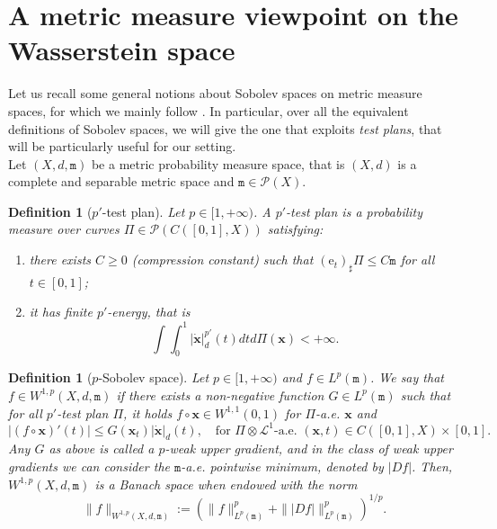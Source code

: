 \documentclass[10pt,leqno]{amsart}
\numberwithin{equation}{section}
\newtheorem{df}[teorema]{Definition}
\newcommand{\PP}{\mathcal{P}}
\newcommand{\e}{\mathrm{e}}
\newcommand{\ttm}{\mathtt{m}}
\begin{document}
\section{A metric measure viewpoint on the Wasserstein space}\label{sec: sobolev and curvature}
Let us recall some general notions about Sobolev spaces on metric measure spaces, for which we mainly follow \cite{gigli2020lectures, AmIkLuPa24}. In particular, over all the equivalent definitions of Sobolev spaces, we will give the one that exploits \textit{test plans}, that will be particularly useful for our setting.
\\
Let $(X,d,\ttm)$ be a metric probability measure space, that is $(X,d)$ is a complete and separable metric space and $\ttm\in \mathcal{P}(X)$.
\begin{df}[$p'$-test plan]
    Let $p\in [1,+\infty)$. A $p'$-test plan is a probability measure over curves $\Pi\in \PP(C([0,1],X))$ satisfying:
    \begin{enumerate}
        \item there exists $C\geq 0$ (compression constant) such that $(\e_t)_\sharp \Pi \leq C \ttm$ for all $t\in[0,1]$;
        \item it has finite $p'$-energy, that is 
        \begin{equation}\label{eq: finite p' energy}
            \int \int_0^1 |\dot{\boldsymbol{x}}|_d^{p'}(t) dt d\Pi(\boldsymbol{x})<+\infty.
        \end{equation}
    \end{enumerate}
\end{df}

\begin{df}[$p$-Sobolev space]
    Let $p\in[1,+\infty)$ and $f\in L^p(\ttm)$. We say that $f\in W^{1,p}(X,d,\ttm)$ if there exists a non-negative function $G \in L^{p}(\ttm)$ such that for all $p'$-test plan $\Pi$, it holds $f\circ \boldsymbol{x} \in W^{1,1}(0,1)$ for $\Pi$-a.e. $\boldsymbol{x}$ and 
    \begin{equation}\label{eq: sob space}
        |(f\circ \boldsymbol{x})'(t)| \leq G(\boldsymbol{x}_t)|\dot{\boldsymbol{x}}|_d(t), \quad \text{for } \Pi \otimes \mathcal{L}^1\text{-a.e. }(\boldsymbol{x},t) \in C([0,1],X)\times [0,1].
    \end{equation}
    Any $G$ as above is called a $p$-weak upper gradient, and in the class of weak upper gradients we can consider the $\ttm$-a.e. pointwise minimum, denoted by $|Df|$. Then, $W^{1,p}(X,d,\ttm)$ is a Banach space when endowed with the norm 
    \begin{equation}
        \|f\|_{W^{1,p}(X,d,\ttm)} := \left(\|f\|_{L^p(\ttm)}^p+ \||Df|\|_{L^p(\ttm)}^p\right)^{1/p}.
    \end{equation}
\end{df}
\end{document}
